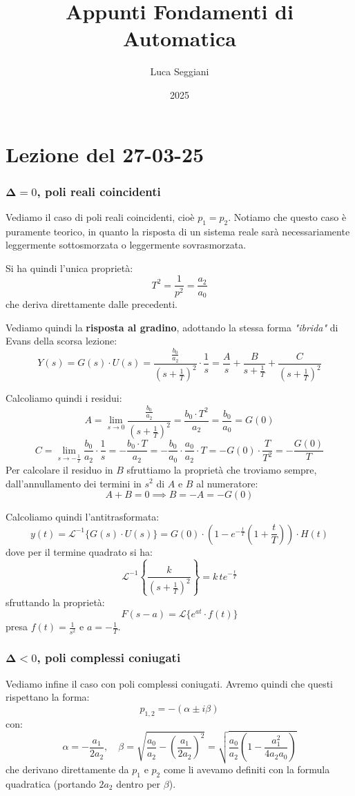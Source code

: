 \documentclass[a4paper,11pt]{article}
\title{Appunti Fondamenti di Automatica}
\author{Luca Seggiani}
\date{2025}
\begin{document}
\section{Lezione del 27-03-25}

\thispagestyle{empty}
\pagestyle{fancy}

\subsubsection{$\mathbf \Delta = 0$, poli reali coincidenti}
Vediamo il caso di poli reali coincidenti, cioè $p_1 = p_2$.
Notiamo che questo caso è puramente teorico, in quanto la risposta di un sistema reale sarà necessariamente leggermente sottosmorzata o leggermente sovrasmorzata.

Si ha quindi l'unica proprietà:
$$
T^2 = \frac{1}{p^2} = \frac{a_2}{a_0}
$$
che deriva direttamente dalle precedenti.

Vediamo quindi la \textbf{risposta al gradino}, adottando la stessa forma \textit{"ibrida"} di Evans della scorsa lezione:
$$
Y(s) = G(s) \cdot U(s) = \frac{ \frac{b_0}{a_2} }{ \left( s + \frac{1}{T} \right)^2 } \cdot \frac{1}{s} = \frac{A}{s} + \frac{B}{s + \frac{1}{T}} + \frac{C}{\left( s + \frac{1}{T} \right)^2}
$$

Calcoliamo quindi i residui:
$$
A = \lim_{s \rightarrow 0} \frac{ \frac{b_0}{a_2} }{ \left( s + \frac{1}{T} \right)^2 } = \frac{b_0 \cdot T^2}{a_2} = \frac{b_0}{a_0} = G(0)
$$
$$
C = \lim_{s \rightarrow - \frac{1}{T}} \frac{b_0}{a_2} \cdot \frac{1}{s} = - \frac{b_0 \cdot T}{a_2} = - \frac{b_0}{a_0} \cdot \frac{a_0}{a_2} \cdot T = - G(0) \cdot \frac{T}{T^2} = -\frac{G(0)}{T}
$$
Per calcolare il residuo in $B$ sfruttiamo la proprietà che troviamo sempre, dall'annullamento dei termini in $s^2$ di $A$ e $B$ al numeratore:
$$
A + B = 0 \implies B = -A = -G(0)
$$

Calcoliamo quindi l'antitrasformata:
$$
y(t) = \mathcal{L}^{-1} \{G(s) \cdot U(s)\} = G(0) \cdot \left( 1 - e^{-\frac{t}{T}} \left( 1 + \frac{t}{T} \right) \right) \cdot H(t)
$$
dove per il termine quadrato si ha:
$$
\mathcal{L}^{-1} \left\{ \frac{ k }{ \left( s + \frac{1}{T} \right)^2 } \right\} = k \, t e^{-\frac{t}{T}}
$$
sfruttando la proprietà:
$$
F(s - a) = \mathcal{L} \{ e^{at} \cdot f(t) \}
$$
presa $f(t) = \frac{1}{s^2}$ e $a = -\frac{1}{T}$.

\subsubsection{$\mathbf \Delta < 0$, poli complessi coniugati}
Vediamo infine il caso con poli complessi coniugati.
Avremo quindi che questi rispettano la forma:
$$
p_{1,2} =  - \left( \alpha \pm i \beta \right)
$$
con:
$$
\alpha = -\frac{a_1}{2a_2}, \quad \beta = \sqrt{ \frac{a_0}{a_2} - \left( \frac{a_1}{2 a_2} \right)^2 } = \sqrt{ \frac{a_0}{a_2} \left( 1 - \frac{a_1^2}{4 a_2 a_0} \right) }
$$
che derivano direttamente da $p_1$ e $p_2$ come li avevamo definiti con la formula quadratica (portando $2 a_2$ dentro per $\beta$).
\end{document}
